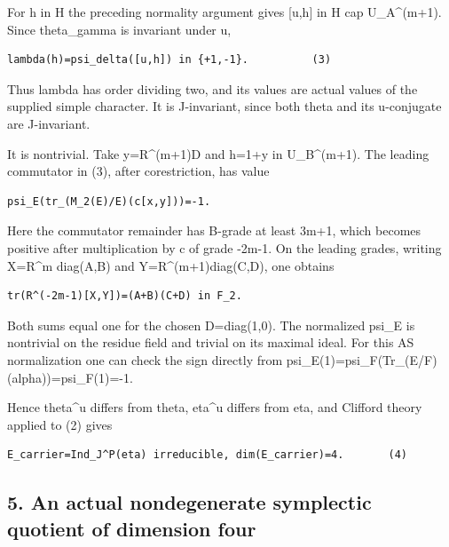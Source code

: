 For h in H the preceding normality argument gives {[}u,h{]} in H cap
U\_A\^{}(m+1). Since theta\_gamma is invariant under u,

\begin{Verbatim}[fontsize=\small,breaklines=true,breakanywhere=true]
lambda(h)=psi_delta([u,h]) in {+1,-1}.          (3)
\end{Verbatim}

Thus lambda has order dividing two, and its values are actual values of
the supplied simple character. It is J-invariant, since both theta and
its u-conjugate are J-invariant.

It is nontrivial. Take y=R\^{}(m+1)D and h=1+y in U\_B\^{}(m+1). The
leading commutator in (3), after corestriction, has value

\begin{Verbatim}[fontsize=\small,breaklines=true,breakanywhere=true]
psi_E(tr_(M_2(E)/E)(c[x,y]))=-1.
\end{Verbatim}

Here the commutator remainder has B-grade at least 3m+1, which becomes
positive after multiplication by c of grade -2m-1. On the leading
grades, writing X=R\^{}m diag(A,B) and Y=R\^{}(m+1)diag(C,D), one
obtains

\begin{Verbatim}[fontsize=\small,breaklines=true,breakanywhere=true]
tr(R^(-2m-1)[X,Y])=(A+B)(C+D) in F_2.
\end{Verbatim}

Both sums equal one for the chosen D=diag(1,0). The normalized psi\_E is
nontrivial on the residue field and trivial on its maximal ideal. For
this AS normalization one can check the sign directly from
psi\_E(1)=psi\_F(Tr\_(E/F)(alpha))=psi\_F(1)=-1.

Hence theta\^{}u differs from theta, eta\^{}u differs from eta, and
Clifford theory applied to (2) gives

\begin{Verbatim}[fontsize=\small,breaklines=true,breakanywhere=true]
E_carrier=Ind_J^P(eta) irreducible, dim(E_carrier)=4.       (4)
\end{Verbatim}

\hypertarget{rank~4-an-actual-nondegenerate-symplectic-quotient-of-dimension-four}{%
\subsection{5. An actual nondegenerate symplectic quotient of dimension
four}\label{rank~4-an-actual-nondegenerate-symplectic-quotient-of-dimension-four}}

